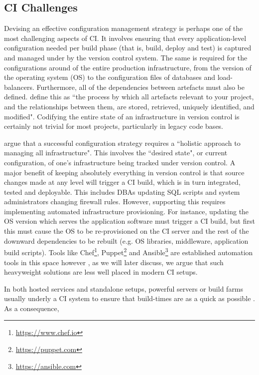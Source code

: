 \documentclass[journal]{IEEEtran}
\begin{document}
\subsection{CI Challenges}
Devising an effective configuration management strategy is perhaps one of the
most challenging aspects of CI. It involves ensuring that every application-level configuration
needed per build phase (that is, build, deploy and test) is captured and managed under by the
version control system. The same is required for the configurations around of the entire
production infrastructure, from the version of the operating system (OS)
to the configuration files of databases and load-balancers. Furthermore, all of 
the dependencies between artefacts must also be defined. \citep{Jez}
define this as ``the process by which all artefacts relevant to
your project, and the relationships between them, are stored, retrieved, uniquely
identified, and modified". Codifying the entire state of an infrastructure in
version control is certainly not trivial for most projects, particularly in legacy code bases.
\par
\citep{Jez} argue that a successful configuration strategy requires a ``holistic approach to 
managing all infrastructure". This involves the ``desired state", or current configuration, of 
one's infrastructure being tracked under version control. A major benefit of keeping
absolutely everything in version control is that source 
changes made at any level will trigger a CI build, which is in turn integrated, tested and deployable. 
This includes DBAs updating SQL scripts and system administrators changing firewall 
rules. However, supporting this requires implementing automated infrastructure provisioning.
For instance, updating the OS version which serves the application software
must trigger a CI build, but first this must cause 
the OS to be re-provisioned on the CI server and the rest of the downward dependencies 
to be rebuilt (e.g. OS libraries, middleware, application build scripts).  Tools like 
Chef\footnote{\href{https://www.chef.io}{https://www.chef.io}},
Puppet\footnote{\href{https://puppet.com}{https://puppet.com}}
and Ansible\footnote{\href{https://www.ansible.com}{https://ansible.com}}
 are established automation tools in this space however \citep{Rensin}, as we will later discuss, 
we argue that such heavyweight solutions are less well placed in modern CI setups.
\par
In both hosted services and standalone setups, powerful servers or build farms usually 
underly a CI system to ensure that build-times are as a quick as possible \citep{Campos}. As a consequence,
\end{document}
